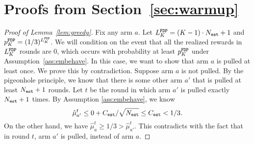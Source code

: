 \section{Proofs from Section~\ref{sec:warmup}}
\label{app:warmup}

\begin{proof}[Proof of Lemma~\ref{lem:greedy}]
  Fix any arm $a$. Let $L^\mathtt{FDP}_K = (K-1) \cdot N_{\mathtt{est}} + 1$ and
  $p^\mathtt{FDP}_K = (1/3)^{L^\mathtt{FDP}_K}$. We will condition on the event that
    all the realized rewards in $L^\mathtt{FDP}_K$ rounds are 0, which occurs with
    probability at least $p^\mathtt{FDP}_K$ under Assumption~\ref{ass:embehave}.
  In this case, we want to show that arm $a$ is pulled at least
  once. We prove this by contradiction. Suppose arm $a$ is not pulled. By
  the pigeonhole principle, we know that there is some other arm $a'$
  that is pulled at least $N_{\mathtt{est}} + 1$ rounds. Let $t$ be the round in
  which arm $a'$ is pulled exactly $N_{\mathtt{est}} + 1$ times. By Assumption
  \ref{ass:embehave}, we know
  \[
    \hat{\mu}_{a'}^t \leq 0 + C_{\mathtt{est}} / \sqrt{N_{\mathtt{est}}}  \leq C_{\mathtt{est}} < 1/3.
  \]
  On the other hand, we have
  $\hat{\mu}_a^t \geq 1/3 > \hat{\mu}_{a'}^t$. This contradicts with
  the fact that in round $t$, arm $a'$ is pulled, instead of arm $a$.
\end{proof}


